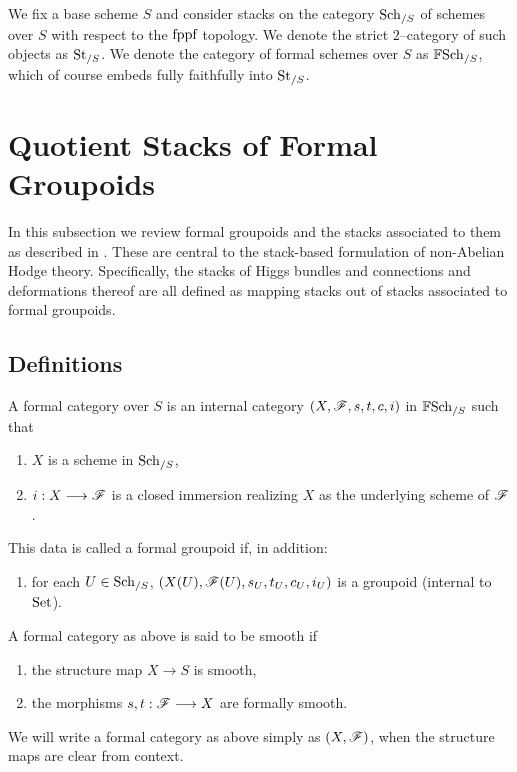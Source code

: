 \documentclass[11pt]{amsart}
\begin{document}
We fix a base scheme $S$ and consider stacks on the category $\mathrm{Sch}_{/S}$ of
schemes over $S$ with respect to the $\text{fppf}$ topology.
We denote the strict $2$--category of such objects as $\mathrm{St}_{/S}$.
We denote the category of formal schemes over $S$ as $\mathbb{F}\mathrm{Sch}_{/S}$, which
of course embeds fully faithfully into $\mathrm{St}_{/S}$.

\section{Quotient Stacks of Formal Groupoids}

In this subsection we review formal groupoids and the stacks associated
to them as described in \cite[\S 3.1]{GeomNonAbHodgeFilt}. These are central
to the stack-based formulation of non-Abelian Hodge theory. Specifically,
the stacks of Higgs bundles and connections and deformations thereof
are all defined as mapping stacks out of stacks associated to formal
groupoids.

\subsection{Definitions}

\begin{defn}
\label{defn:form-cat}
A formal category over $S$ is an internal category $(X, \mathscr{F}, s, t, c, i)$ in
$\mathbb{F}\mathrm{Sch}_{/S}$ such that
\begin{enumerate}
\item $X$ is a scheme in $\mathrm{Sch}_{/S}$,
\item $i : X \to \sF$ is a closed immersion realizing $X$ as the underlying
scheme of $\mathscr{F}$.
\end{enumerate}
This data is called a formal groupoid if, in addition:
\begin{enumerate}[resume]
\item for each $U \in \mathrm{Sch}_{/S}$, $(X(U), \mathscr{F}(U), s_U, t_U, c_U, i_U)$
is a groupoid (internal to $\mathrm{Set}$).
\end{enumerate}
A formal category as above is said to be smooth if
\begin{enumerate}[resume]
\item the structure map $X \to S$ is smooth,
\item the morphisms $s, t : \sF \to X$ are formally smooth.
\end{enumerate}
\end{defn}

\begin{notn}
We will write a formal category as above simply as $(X, \mathscr{F})$,
when the structure maps are clear from context.
\end{notn}
\end{document}
